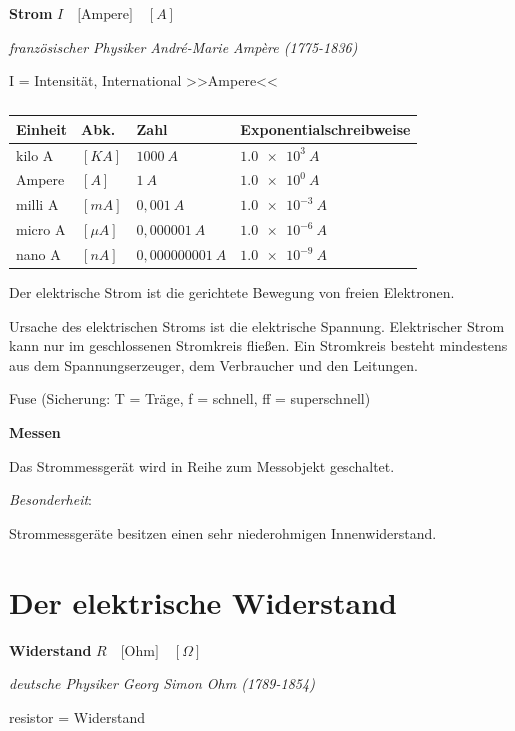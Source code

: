 \textbf{Strom} $I \quad \text{[Ampere]} \quad [A]$

\emph{französischer Physiker André-Marie Ampère (1775-1836)}

I = Intensität, International >>Ampere<<

\begin{table}[!ht]%
\centering 
	\caption{}%
\begin{tabular}{@{}llll@{}}
\hline
\textbf{Einheit} & \textbf{Abk.} & \textbf{Zahl} &
\textbf{Exponentialschreibweise} \\
\hline
kilo A & $[KA]$ & $1000~A$ & $\num{1,0e3}~A$ \\
Ampere & $[A]$ & $1~A$ & $\num{1,0e0}~A$ \\
milli A & $[mA]$ & $0,001~A$ & $\num{1,0e-3}~A$ \\
micro A & $[\mu A]$ & $0,000001~A$ & $\num{1,0e-6}~A$ \\
nano A & $[nA]$ & $0,000000001~A$ & $\num{1,0e-9}~A$ \\
\hline
\end{tabular} 
\end{table}

Der elektrische Strom ist die gerichtete Bewegung von freien Elektronen.

Ursache des elektrischen Stroms ist die elektrische Spannung.
Elektrischer Strom kann nur im geschlossenen Stromkreis fließen. Ein
Stromkreis besteht mindestens aus dem Spannungserzeuger, dem Verbraucher
und den Leitungen.

Fuse (Sicherung: T = Träge, f = schnell, ff = superschnell)

\textbf{Messen}

Das Strommessgerät wird in Reihe zum Messobjekt geschaltet.

\emph{Besonderheit}:

Strommessgeräte besitzen einen sehr niederohmigen Innenwiderstand.

\newpage

\section{Der elektrische Widerstand}\label{der-elektrische-widerstand}

\textbf{Widerstand} $R \quad \text{[Ohm]} \quad [\Omega]$

\emph{deutsche Physiker Georg Simon Ohm (1789-1854)}

resistor = Widerstand

